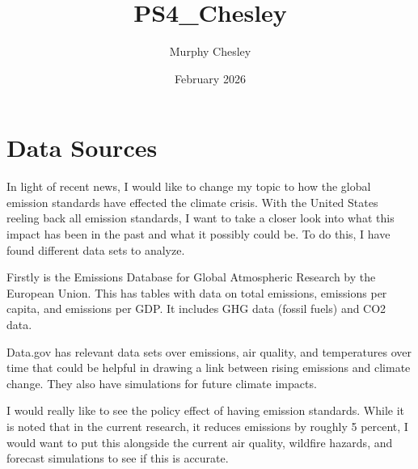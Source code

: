\documentclass{article}
\title{PS4_Chesley}
\author{Murphy Chesley}
\date{February 2026}
\begin{document}
\maketitle

\section{Data Sources}

In light of recent news, I would like to change my topic to how the global emission standards have effected the climate crisis. With the United States reeling back all emission standards, I want to take a closer look into what this impact has been in the past and what it possibly could be. To do this, I have found different data sets to analyze.

Firstly is the Emissions Database for Global Atmospheric Research by the European Union. This has tables with data on total emissions, emissions per capita, and emissions per GDP. It includes GHG data (fossil fuels) and CO2 data. 

Data.gov has relevant data sets over emissions, air quality, and temperatures over time that could be helpful in drawing a link between rising emissions and climate change. They also have simulations for future climate impacts.

I would really like to see the policy effect of having emission standards. While it is noted that in the current research, it reduces emissions by roughly 5 percent, I would want to put this alongside the current air quality, wildfire hazards, and forecast simulations to see if this is accurate.
\end{document}
